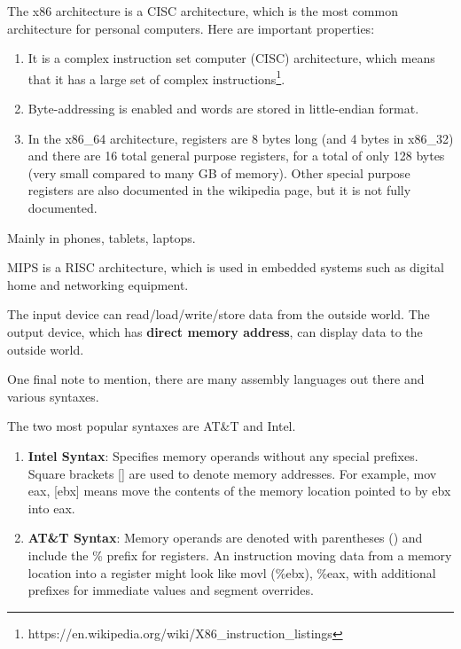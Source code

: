 \documentclass{article}
\begin{document}
    \begin{example}[x86 Architecture]
      The x86 architecture is a CISC architecture, which is the most common architecture for personal computers. Here are important properties: 
      \begin{enumerate} 
        \item It is a complex instruction set computer (CISC) architecture, which means that it has a large set of complex instructions\footnote{https://en.wikipedia.org/wiki/X86\_instruction\_listings}. 
        \item Byte-addressing is enabled and words are stored in little-endian format.
        \item In the x86\_64 architecture, registers are 8 bytes long (and 4 bytes in x86\_32) and there are 16 total general purpose registers, for a total of only 128 bytes (very small compared to many GB of memory). Other special purpose registers are also documented in the wikipedia page, but it is not fully documented. 
      \end{enumerate}
    \end{example}

    \begin{example}
      Mainly in phones, tablets, laptops. 
    \end{example}

    \begin{example}
      MIPS is a RISC architecture, which is used in embedded systems such as digital home and networking equipment. 
    \end{example}


    \begin{definition}
      The input device can read/load/write/store data from the outside world. The output device, which has \textbf{direct memory address}, can display data to the outside world. 
    \end{definition}

    One final note to mention, there are many assembly languages out there and various syntaxes. 

    \begin{example}
      The two most popular syntaxes are AT\&T and Intel. 
      \begin{enumerate}
        \item \textbf{Intel Syntax}: Specifies memory operands without any special prefixes. Square brackets [] are used to denote memory addresses. For example, mov eax, [ebx] means move the contents of the memory location pointed to by ebx into eax.

        \item \textbf{AT\&T Syntax}: Memory operands are denoted with parentheses () and include the \% prefix for registers. An instruction moving data from a memory location into a register might look like movl (\%ebx), \%eax, with additional prefixes for immediate values and segment overrides.
      \end{enumerate}
    \end{example}
\end{document}
